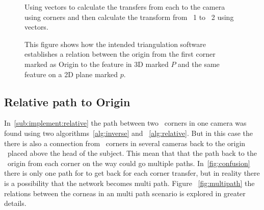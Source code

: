 \begin{figure}
    \centering
    \caption{Using vectors to calculate the transfers from each \aruco to the camera using \aruco corners and then calculate the transform from \aruco\ 1 to \aruco\ 2 using vectors.}
    \label{fig:vector_transfers}
\end{figure}


\begin{figure}[ht]
    \begin{center}
        
    \end{center}
    \caption{ This figure shows how the intended triangulation software establishes a relation between the origin from the first \aruco corner marked as Origin
        to the feature in 3D marked $P$ and the same feature on a 2D plane marked $p$.}
    \label{fig:camera_transfer}
\end{figure}




\subsection{Relative path to Origin}\label{sub:implement:relativepath}
In~\ref{sub:implement:relative} the path between two \aruco\ corners in one camera was found using two algorithms~\ref{alg:inverse} and ~\ref{alg:relative}.
But in this case the there is also a connection from \aruco\ corners in several cameras back to the origin \aruco\ placed above the head of the subject.
This mean that that the path back to the \aruco\ origin from each corner on the way could go multiple paths.
In~\ref{fig:confusion} there is only one path for to get back for each corner transfer, but in reality there is a possibility that the network becomes multi path.
Figure ~\ref{fig:multipath} the relations between the corneas in an multi path scenario is explored in greater details.


